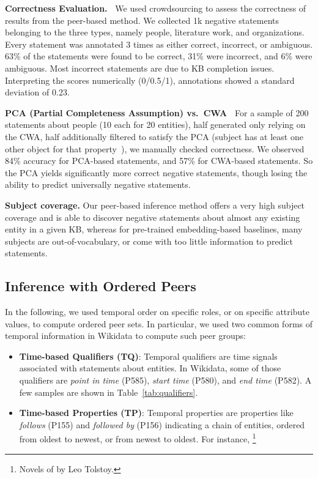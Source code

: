 \noindent
\textbf{Correctness Evaluation.\ } We used crowdsourcing to assess the correctness of results from the peer-based method. We collected 1k negative statements belonging to the three types, namely people, literature work, and organizations. Every statement was annotated 3 times as either correct, incorrect, or ambiguous. 63\% of the statements were found to be correct, 31\% were incorrect, and 6\% were ambiguous. Most incorrect statements are due to KB completion issues. Interpreting the scores numerically (0/0.5/1), annotations showed a standard deviation of 0.23. 

\noindent
\textbf{PCA (Partial Completeness Assumption) vs.\ CWA\ }
For a sample of 200 statements about people (10 each for 20 entities), half generated only relying on the CWA, half additionally filtered to satisfy the PCA (subject has at least one other object for that property~\cite{AMIEP}), we manually checked correctness.
We observed  84\% accuracy
for PCA-based statements, and 57\% for CWA-based statements. So the PCA yields significantly more correct negative statements, though losing the ability to predict universally negative statements.

\noindent
\textbf{Subject coverage.} Our peer-based inference method offers a very high subject coverage and is able to discover negative statements about almost any existing entity in a given KB, whereas for pre-trained embedding-based baselines, many subjects are out-of-vocabulary, or come with too little information to predict statements.








\subsection{Inference with Ordered Peers}
\label{sub:temporalexperiments}

In the following, we used temporal order on specific roles, or on specific attribute values, to compute ordered peer sets. In particular, we used two common forms of temporal information in Wikidata to compute such peer groups: 
\begin{itemize}
    \item \textbf{Time-based Qualifiers (TQ)}: Temporal qualifiers are time signals associated with statements about entities. In Wikidata, some of those qualifiers are \textit{point in time} (P585), \textit{start time} (P580), and \textit{end time} (P582). A few samples are shown in Table~\ref{tab:qualifiers}.
    \item \textbf{Time-based Properties (TP)}: Temporal properties are properties like \textit{follows} (P155) and \textit{followed by} (P156) indicating a chain of entities, ordered from oldest to newest, or from newest to oldest. For instance, \footnote{Novels of by Leo Tolstoy.}
\end{itemize}

